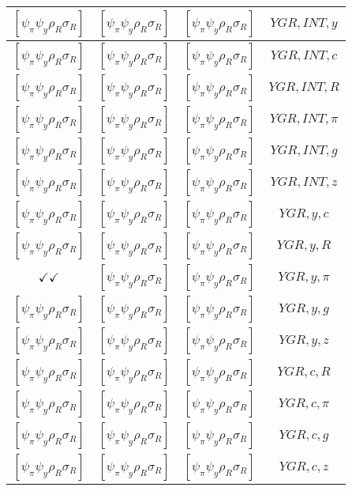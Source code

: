 \documentclass[a4paper,10pt]{article}
\begin{document}
\begin{longtable}{|c|c|c|c|}
\hline
$[\psi_\pi \psi_y \rho_R \sigma_R ]$ & $[\psi_\pi \psi_y \rho_R \sigma_R ]$ & $[\psi_\pi \psi_y \rho_R \sigma_R ]$ & ${YGR},{INT},{y}$ \\
\hline
$[\psi_\pi \psi_y \rho_R \sigma_R ]$ & $[\psi_\pi \psi_y \rho_R \sigma_R ]$ & $[\psi_\pi \psi_y \rho_R \sigma_R ]$ & ${YGR},{INT},{c}$ \\
\hline
$[\psi_\pi \psi_y \rho_R \sigma_R ]$ & $[\psi_\pi \psi_y \rho_R \sigma_R ]$ & $[\psi_\pi \psi_y \rho_R \sigma_R ]$ & ${YGR},{INT},{R}$ \\
\hline
$[\psi_\pi \psi_y \rho_R \sigma_R ]$ & $[\psi_\pi \psi_y \rho_R \sigma_R ]$ & $[\psi_\pi \psi_y \rho_R \sigma_R ]$ & ${YGR},{INT},{\pi}$ \\
\hline
$[\psi_\pi \psi_y \rho_R \sigma_R ]$ & $[\psi_\pi \psi_y \rho_R \sigma_R ]$ & $[\psi_\pi \psi_y \rho_R \sigma_R ]$ & ${YGR},{INT},{g}$ \\
\hline
$[\psi_\pi \psi_y \rho_R \sigma_R ]$ & $[\psi_\pi \psi_y \rho_R \sigma_R ]$ & $[\psi_\pi \psi_y \rho_R \sigma_R ]$ & ${YGR},{INT},{z}$ \\
\hline
$[\psi_\pi \psi_y \rho_R \sigma_R ]$ & $[\psi_\pi \psi_y \rho_R \sigma_R ]$ & $[\psi_\pi \psi_y \rho_R \sigma_R ]$ & ${YGR},{y},{c}$ \\
\hline
$[\psi_\pi \psi_y \rho_R \sigma_R ]$ & $[\psi_\pi \psi_y \rho_R \sigma_R ]$ & $[\psi_\pi \psi_y \rho_R \sigma_R ]$ & ${YGR},{y},{R}$ \\
\hline
$\checkmark\checkmark$ & $[\psi_\pi \psi_y \rho_R \sigma_R ]$ & $[\psi_\pi \psi_y \rho_R \sigma_R ]$ & ${YGR},{y},{\pi}$ \\
\hline
$[\psi_\pi \psi_y \rho_R \sigma_R ]$ & $[\psi_\pi \psi_y \rho_R \sigma_R ]$ & $[\psi_\pi \psi_y \rho_R \sigma_R ]$ & ${YGR},{y},{g}$ \\
\hline
$[\psi_\pi \psi_y \rho_R \sigma_R ]$ & $[\psi_\pi \psi_y \rho_R \sigma_R ]$ & $[\psi_\pi \psi_y \rho_R \sigma_R ]$ & ${YGR},{y},{z}$ \\
\hline
$[\psi_\pi \psi_y \rho_R \sigma_R ]$ & $[\psi_\pi \psi_y \rho_R \sigma_R ]$ & $[\psi_\pi \psi_y \rho_R \sigma_R ]$ & ${YGR},{c},{R}$ \\
\hline
$[\psi_\pi \psi_y \rho_R \sigma_R ]$ & $[\psi_\pi \psi_y \rho_R \sigma_R ]$ & $[\psi_\pi \psi_y \rho_R \sigma_R ]$ & ${YGR},{c},{\pi}$ \\
\hline
$[\psi_\pi \psi_y \rho_R \sigma_R ]$ & $[\psi_\pi \psi_y \rho_R \sigma_R ]$ & $[\psi_\pi \psi_y \rho_R \sigma_R ]$ & ${YGR},{c},{g}$ \\
\hline
$[\psi_\pi \psi_y \rho_R \sigma_R ]$ & $[\psi_\pi \psi_y \rho_R \sigma_R ]$ & $[\psi_\pi \psi_y \rho_R \sigma_R ]$ & ${YGR},{c},{z}$ \\

\end{longtable}
\end{document}
